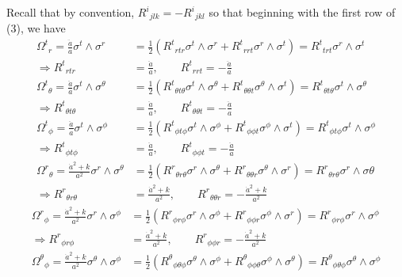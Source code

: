 \documentclass[a4paper, 11pt]{article}
\newenvironment{solution}{%
	\begin{list}{}{%
			\setlength{\topsep}{0pt}%
			\setlength{\leftmargin}{0.5cm}%
			\setlength{\rightmargin}{0.5cm}%
			\setlength{\listparindent}{\parindent}%
			\setlength{\itemindent}{\parindent}%
			\setlength{\parsep}{\parskip}%
		}%
		\item[]}{\end{list}}
\begin{document}
\begin{enumerate}[leftmargin=0em, label=\textbf{\arabic*}.]
\begin{solution}
      Recall that by convention, $R^i{}_{jlk}=-R^i{}_{jkl}$ so that beginning
      with the first row of (3), we have
      \begin{align}
        \Omega^t{}_r = \frac{\ddot{a}}{a}\sigma^t\wedge\sigma^r &= \frac{1}{2}\left( R^t{}_{rtr}\sigma^t\wedge\sigma^r+R^t{}_{rrt}\sigma^r\wedge\sigma^t \right)  = R^t{}_{trt}\sigma^r\wedge\sigma^t \\
        \Rightarrow R^t{}_{rtr} &= \frac{\ddot{a}}{a}, \qquad R^t{}_{rrt} = -\frac{\ddot{a}}{a} \\
        \Omega^t{}_\theta = \frac{\ddot{a}}{a}\sigma^t\wedge\sigma^\theta &= \frac{1}{2}\left( R^t{}_{\theta t \theta}\sigma^t\wedge\sigma^\theta+R^t{}_{\theta\theta t}\sigma^\theta\wedge\sigma^t \right) = R^t{}_{\theta t \theta}\sigma^t\wedge\sigma^\theta \\
        \Rightarrow R^t{}_{\theta t \theta} &= \frac{\ddot{a}}{a}, \qquad R^t{}_{\theta\theta t} = -\frac{\ddot{a}}{a} \\ 
        \Omega^t{}_\phi = \frac{\ddot{a}}{a}\sigma^t\wedge\sigma^\phi &= \frac{1}{2}\left( R^t{}_{\phi t \phi}\sigma^t\wedge\sigma^\phi+R^t{}_{\phi\phi t}\sigma^\phi\wedge\sigma^t \right) = R^t{}_{\phi t \phi}\sigma^t\wedge\sigma^\phi \\
        \Rightarrow R^t{}_{\phi t \phi} &= \frac{\ddot{a}}{a}, \qquad R^t{}_{\phi\phi t} = -\frac{\ddot{a}}{a} \\
        \Omega^r{}_\theta = \frac{\dot{a}^2+k}{a^2}\sigma^r\wedge\sigma^\theta &= \frac{1}{2}\left( R^r{}_{\theta r \theta}\sigma^r\wedge\sigma^\theta+R^{r}{}_{\theta\theta r}\sigma^\theta\wedge\sigma^r \right) = R^r{}_{\theta r \theta}\sigma^r\wedge\sigma\theta \\
        \Rightarrow R^r{}_{\theta r \theta} &= \frac{\dot{a}^2+k}{a^2},\qquad R^r{}_{\theta\theta r}=- \frac{\dot{a}^2+k}{a^2}
      \end{align}
      \begin{align}
           \Omega^r{}_\phi = \frac{\dot{a}^2+k}{a^2}\sigma^r\wedge\sigma^\phi &= \frac{1}{2}\left( R^r{}_{\phi r \phi}\sigma^r\wedge\sigma^\phi+R^{r}{}_{\phi\phi r}\sigma^\phi\wedge\sigma^r \right) = R^r{}_{\phi r \phi}\sigma^r\wedge\sigma^\phi \\
        \Rightarrow R^r{}_{\phi r \phi} &= \frac{\dot{a}^2+k}{a^2},\qquad R^r{}_{\phi\phi r}=- \frac{\dot{a}^2+k}{a^2}\\
            \Omega^\theta{}_\phi = \frac{\dot{a}^2+k}{a^2}\sigma^\theta\wedge\sigma^\phi &= \frac{1}{2}\left( R^\theta{}_{\phi \theta \phi}\sigma^\theta\wedge\sigma^\phi+R^\theta{}_{\phi\phi \theta}\sigma^\phi\wedge\sigma^\theta \right) = R^\theta{}_{\phi \theta \phi}\sigma^\theta\wedge\sigma^\phi \\

\end{align}
\end{solution}
\end{enumerate}
\end{document}
